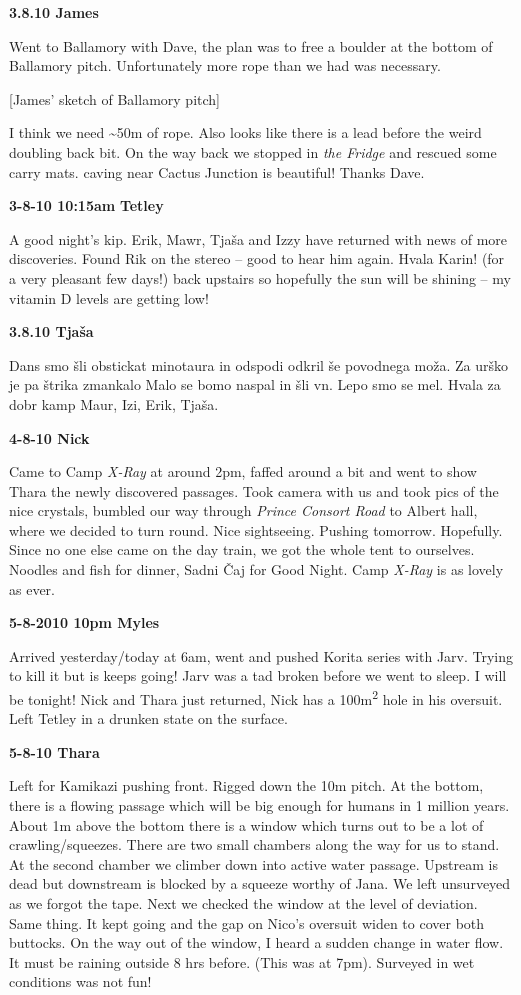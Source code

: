 \textbf{3.8.10 James}

Went to Ballamory with Dave, the plan was to free a boulder at the
bottom of Ballamory pitch. Unfortunately more rope than we had was
necessary.

{[}James' sketch of Ballamory pitch{]}

I think we need \textasciitilde{}50m of rope. Also looks like there is a
lead before the weird doubling back bit. On the way back we stopped in
\emph{the Fridge} and rescued some carry mats. caving near Cactus
Junction is beautiful! Thanks Dave.

\textbf{3-8-10 10:15am} \textbf{Tetley}

A good night's kip. Erik, Mawr, Tjaša and Izzy have returned with news
of more discoveries. Found Rik on the stereo -- good to hear him again.
Hvala Karin! (for a very pleasant few days!) back upstairs so hopefully
the sun will be shining -- my vitamin D levels are getting low!

\textbf{3.8.10 Tjaša}

Dans smo šli obstickat minotaura in odspodi odkril še povodnega moža. Za
urško je pa štrika zmankalo Malo se bomo naspal in šli vn. Lepo smo se
mel. Hvala za dobr kamp Maur, Izi, Erik, Tjaša.

\textbf{4-8-10 Nick}

Came to Camp \emph{X-Ray} at around 2pm, faffed around a bit and went to
show Thara the newly discovered passages. Took camera with us and took
pics of the nice crystals, bumbled our way through \emph{Prince Consort
Road} to Albert hall, where we decided to turn round. Nice sightseeing.
Pushing tomorrow. Hopefully. Since no one else came on the day train, we
got the whole tent to ourselves. Noodles and fish for dinner, Sadni Čaj
for Good Night. Camp \emph{X-Ray} is as lovely as ever.

\textbf{5-8-2010 10pm Myles}

Arrived yesterday/today at 6am, went and pushed Korita series with Jarv.
Trying to kill it but is keeps going! Jarv was a tad broken before we
went to sleep. I will be tonight! Nick and Thara just returned, Nick has
a 100m\textsuperscript{2} hole in his oversuit. Left Tetley in a drunken
state on the surface.

\textbf{5-8-10 Thara}

Left for Kamikazi pushing front. Rigged down the 10m pitch. At the
bottom, there is a flowing passage which will be big enough for humans
in 1 million years. About 1m above the bottom there is a window which
turns out to be a lot of crawling/squeezes. There are two small chambers
along the way for us to stand. At the second chamber we climber down
into active water passage. Upstream is dead but downstream is blocked by
a squeeze worthy of Jana. We left unsurveyed as we forgot the tape. Next
we checked the window at the level of deviation. Same thing. It kept
going and the gap on Nico's oversuit widen to cover both buttocks. On
the way out of the window, I heard a sudden change in water flow. It
must be raining outside 8 hrs before. (This was at 7pm). Surveyed in wet
conditions was not fun!

